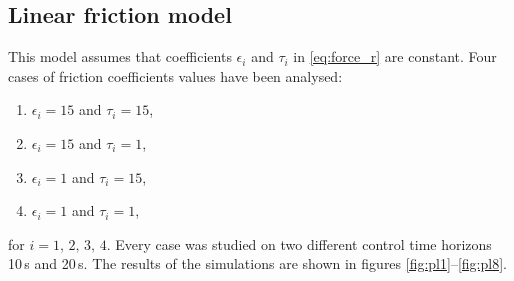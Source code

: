 \subsection{Linear friction model}
This model assumes that coefficients $\epsilon_i$ and $\tau_i$ in \eqref{eq:force_r} are constant. Four cases of friction coefficients values have been analysed:
\begin{enumerate}
\item $\epsilon_i=15$ and $\tau_i=15$,
\item $\epsilon_i=15$ and $\tau_i=1$,
\item $\epsilon_i=1$ and $\tau_i=15$,
\item $\epsilon_i=1$ and $\tau_i=1$,
\end{enumerate}
for $i=1,\,2,\,3,\,4$.
Every case was studied on two different control time horizons 10\,s and 20\,s. The results of the
simulations are shown in figures \ref{fig:pl1}--\ref{fig:pl8}.

